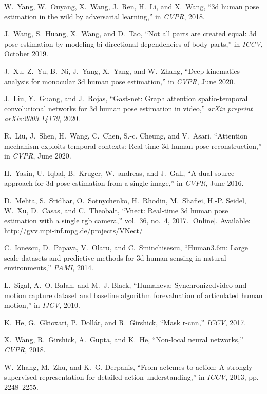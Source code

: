 \documentclass[journal]{IEEEtran}
\begin{document}
\begin{thebibliography}{10}
W.~Yang, W.~Ouyang, X.~Wang, J.~Ren, H.~Li, and X.~Wang, ``3d human pose
  estimation in the wild by adversarial learning,'' in \emph{CVPR}, 2018.

J.~Wang, S.~Huang, X.~Wang, and D.~Tao, ``Not all parts are created equal: 3d
  pose estimation by modeling bi-directional dependencies of body parts,'' in
  \emph{ICCV}, October 2019.

J.~Xu, Z.~Yu, B.~Ni, J.~Yang, X.~Yang, and W.~Zhang, ``Deep kinematics analysis
  for monocular 3d human pose estimation,'' in \emph{CVPR}, June 2020.

J.~Liu, Y.~Guang, and J.~Rojas, ``Gast-net: Graph attention spatio-temporal
  convolutional networks for 3d human pose estimation in video,'' \emph{arXiv
  preprint arXiv:2003.14179}, 2020.

R.~Liu, J.~Shen, H.~Wang, C.~Chen, S.-c. Cheung, and V.~Asari, ``Attention
  mechanism exploits temporal contexts: Real-time 3d human pose
  reconstruction,'' in \emph{CVPR}, June 2020.

H.~Yasin, U.~Iqbal, B.~Kruger, W.~andreas, and J.~Gall, ``A dual-source
  approach for 3d pose estimation from a single image,'' in \emph{CVPR}, June
  2016.

\BIBentryALTinterwordspacing
D.~Mehta, S.~Sridhar, O.~Sotnychenko, H.~Rhodin, M.~Shafiei, H.-P. Seidel,
  W.~Xu, D.~Casas, and C.~Theobalt, ``Vnect: Real-time 3d human pose estimation
  with a single rgb camera,'' vol.~36, no.~4, 2017. [Online]. Available:
  \url{http://gvv.mpi-inf.mpg.de/projects/VNect/}
\BIBentrySTDinterwordspacing

C.~Ionescu, D.~Papava, V.~Olaru, and C.~Sminchisescu, ``Human3.6m: Large scale
  datasets and predictive methods for 3d human sensing in natural
  environments,'' \emph{PAMI}, 2014.

L.~Sigal, A.~O. Balan, and M.~J. Black, ``Humaneva: Synchronizedvideo and
  motion capture dataset and baseline algorithm forevaluation of articulated
  human motion,'' in \emph{IJCV}, 2010.

K.~He, G.~Gkioxari, P.~Dollár, and R.~Girshick, ``Mask r-cnn,'' \emph{ICCV},
  2017.

X.~Wang, R.~Girshick, A.~Gupta, and K.~He, ``Non-local neural networks,''
  \emph{CVPR}, 2018.

W.~Zhang, M.~Zhu, and K.~G. Derpanis, ``From actemes to action: A
  strongly-supervised representation for detailed action understanding,'' in
  \emph{ICCV}, 2013, pp. 2248--2255.

\end{thebibliography}
 
\end{document}
